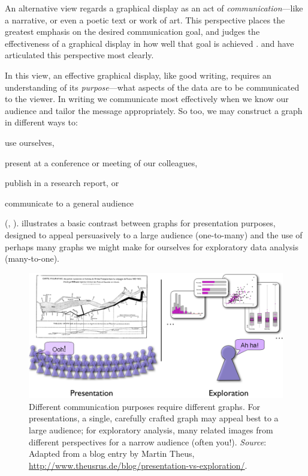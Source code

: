 \documentclass[10pt,krantz2]{krantz}\usepackage[]{graphicx}\usepackage[]{color}
\begin{document}
An alternative view regards a graphical display as an act
of \emph{communication}---like a narrative, or even a poetic text or work of art.
This perspective places the greatest emphasis on the desired
communication goal, and judges the effectiveness of a graphical
display in how well that goal is achieved \citep{FriendlyKwan:2011}.
\citet{Kosslyn:85,Kosslyn:89} and \citet{Tufte:83,Tufte:90,Tufte:97}
have articulated this perspective most clearly.

In this view,
an effective graphical display, like good writing, requires an
understanding of its \emph{purpose}---what aspects of the data are to be
communicated to the viewer.  In writing we communicate most
effectively when we know our audience and tailor the message
appropriately. So too, we may construct a graph in different ways to:
\begin{seriate}
  \item use ourselves,
  \item present at a conference or meeting of our colleagues,
  \item publish in a research report, or
  \item communicate to a general audience
\end{seriate}
(\citet[Ch. 1]{Friendly:91}, \citet{FriendlyKwan:2011}).
 illustrates a basic contrast between graphs
for presentation purposes, designed to appeal persuasively to a large audience
(one-to-many)
and the use of perhaps many graphs we might make for ourselves for
exploratory data analysis (many-to-one).

\begin{figure}[htb]
\centering
\includegraphics[width=.8\textwidth]{ch01/fig/presentation-exploration2}
\caption[Different communication purposes require different graphs]{Different communication purposes require different graphs. For presentations, a single, carefully crafted graph may appeal best to a large audience; for exploratory analysis, many related images from different perspectives for a narrow audience (often you!). \emph{Source}: Adapted from a blog entry by Martin Theus, \url{http://www.theusrus.de/blog/presentation-vs-exploration/}.}\label{fig:presentation-exploration}
\end{figure}
\end{document}

